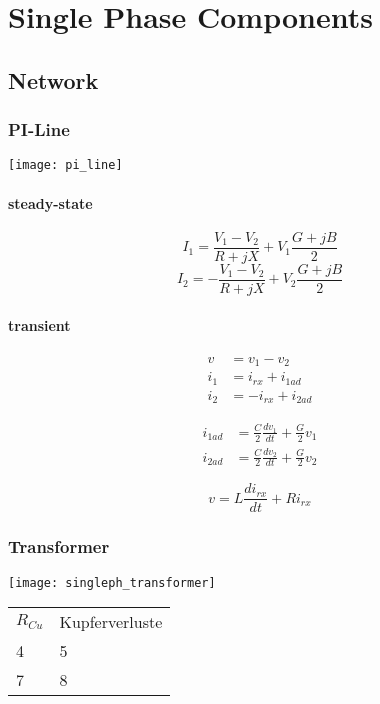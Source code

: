 \chapter{Single Phase Components}

\section{Network}

\subsection{PI-Line}
\texttt{[image: pi\_line]}
\subsubsection{steady-state}
\begin{equation}
	I_1 = \frac{V_1 - V_2}{R+jX} + V_1  \frac{G+jB}{2}
\end{equation}
\begin{equation}
	I_2 = - \frac{V_1 - V_2}{R+jX} + V_2  \frac{G+jB}{2}
\end{equation}

\subsubsection{transient}
\begin{align}
	v &= v_1 - v_2 \\
	i_1 &=  i_{rx} + i_{1ad} \\
	i_2 &= - i_{rx} + i_{2ad}
\end{align}

\begin{align}
	i_{1ad} &= \frac{C}{2} \frac{dv_1}{dt} + \frac{G}{2} v_1 \\
	i_{2ad} &= \frac{C}{2} \frac{dv_2}{dt} + \frac{G}{2} v_2
\end{align}

\begin{equation}
	v = L \frac{di_{rx}}{dt} + R i_{rx}
\end{equation}

\subsection{Transformer}
\texttt{[image: singleph\_transformer]}

\begin{tabular}{ l l }
  $R_{Cu}$ & Kupferverluste \\
  4 & 5 \\
  7 & 8 \\
\end{tabular}

